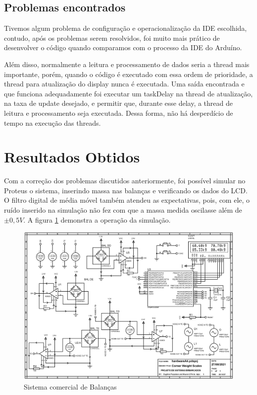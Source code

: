 \documentclass[a4paper, 12pt]{article}
\begin{document}
	\subsection{Problemas encontrados}
	\label{poblemas}
	Tivemos algum problema de configuração e operacionalização da IDE escolhida, contudo, após os problemas serem resolvidos, foi muito mais prático de desenvolver o código quando comparamos com o processo da IDE do Arduíno. 

	Além disso, normalmente a leitura e processamento de dados seria a thread mais importante, porém, quando o código é executado com essa ordem de prioridade, a thread para atualização do display nunca é executada. Uma saída encontrada e que funciona adequadamente foi executar um taskDelay na thread de atualização, na taxa de update desejado, e permitir que, durante esse delay, a thread de leitura e processamento seja executada. Dessa forma, não há desperdício de tempo na execução das threads.  
	
	
	\section{Resultados Obtidos}
	Com a correção dos problemas discutidos anteriormente, foi possível simular no Proteus o sistema, inserindo massa nas balanças e verificando os dados do LCD. O filtro digital de média móvel também atendeu as expectativas, pois, com ele, o ruído inserido na simulação não fez com que a massa medida oscilasse além de $ \pm 0,5V $. A figura \ref{fig:simulacao} demonstra a operação da simulação.
	
	\begin{figure}[!htb]
		\centering
		\includegraphics[width=.85\linewidth]{simulacao}
		\caption{Sistema comercial de Balanças}
		\label{fig:simulacao}
	\end{figure}
\end{document}
